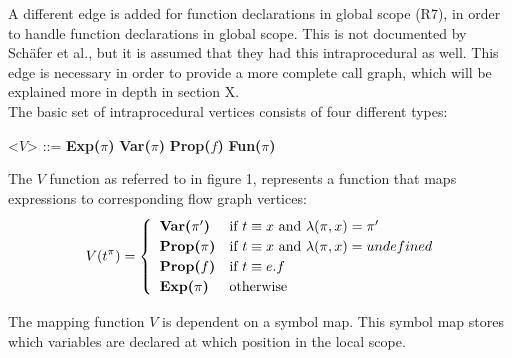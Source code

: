 \documentclass[journal,10pt]{IEEEtran} %
\begin{document}
A different edge is added for function declarations in global scope (R7), in order to handle function declarations in global scope. This is not documented by Sch\"{a}fer et al., but it is assumed that they had this intraprocedural as well. This edge is necessary in order to provide a more complete call graph, which will be explained more in depth in section X. \\ %

The basic set of intraprocedural vertices consists of four different types:
\vspace{0.5em}
\begin{grammar}
<$V$> ::= \textbf{Exp($\pi$)} 
\alt \textbf{Var($\pi$)} 
\alt \textbf{Prop($f$)} 
\alt \textbf{Fun($\pi$)} 
\end{grammar}
\vspace{0.5em}

The $V$ function as referred to in figure 1, represents a function that maps expressions to corresponding flow graph vertices:
\begin{equation*}
  V(t^\pi) = \begin{cases}
    \hspace*{0.2cm} \textbf{Var($\pi'$)} & \text{if~} t \equiv x \text{~and~} \lambda(\pi, x) = \pi' \\
    \hspace*{0.2cm} \textbf{Prop($\pi$)} & \text{if~} t \equiv x \text{~and~} \lambda(\pi, x) = undefined\\
    \hspace*{0.2cm} \textbf{Prop($f$)} & \text{if~} t \equiv e.f \\
    \hspace*{0.2cm} \textbf{Exp($\pi$)} &\text{otherwise}
  \end{cases}
\end{equation*}


The mapping function $V$ is dependent on a symbol map. This symbol map stores which variables are declared at which position in the local scope.
\end{document}

